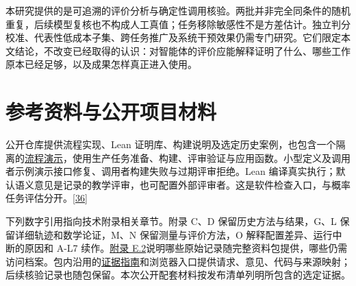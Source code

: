 本研究提供的是可追溯的评价分析与确定性调用核验。两批并非完全同条件的随机重复，后续模型复核也不构成人工真值；任务移除敏感性不是方差估计。独立判分校准、代表性低成本子集、跨任务推广及系统干预效果仍需专门研究。它们限定本文结论，不改变已经取得的认识：对智能体的评价应能解释证明了什么、哪些工作原本已经足够，以及成果怎样真正进入使用。

\section[参考资料与公开项目材料]{\texorpdfstring{\protect\hypertarget{section-7}{}参考资料与公开项目材料}{参考资料与公开项目材料}}
公开仓库提供流程实现、Lean 证明库、构建说明及选定历史案例，也包含一个隔离的\href{https://github.com/Kind-NK-Hill/ProbabilityTheoryFormalization/blob/d07f272850899b58612adf1c7dc202538503252f/docs/workflow_demo.md}{流程演示}，使用生产任务准备、构建、评审验证与应用函数。小型定义及调用者示例演示接口修复、调用者构建失败与过期评审拒绝。Lean 编译真实执行；默认语义意见是记录的教学评审，也可配置外部评审者。这是软件检查入口，与概率任务评估分开。\hyperlink{ref-36}{\mbox{[36]}}

下列数字引用指向技术附录相关章节。附录 C、D 保留历史方法与结果，G、L 保留详细轨迹和数学论证，M、N 保留测量与评价方法，O 解释配置差异、运行中断的原因和 A-L7 续作。\href{zh-appendix.pdf\#e2}{附录 E.2}说明哪些原始记录随完整资料包提供，哪些仍需访问档案。包内沿用的\href{EVIDENCE_GUIDE.pdf}{证据指南}和浏览器入口提供请求、意见、代码与来源映射；后续核验记录也随包保留。本次公开配套材料按发布清单列明所包含的选定证据。

